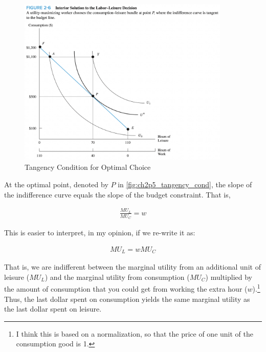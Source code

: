 \FloatBarrier

\begin{figure}[!htb]
    \centering
        \includegraphics[width=0.9\textwidth]{../input/ch_2p5_tangency_cond.png}
    \caption{Tangency Condition for Optimal Choice}
    \label{fig:ch2p5_tangency_cond}
\end{figure}

\FloatBarrier

At the optimal point, denoted by $P$ 
in \autoref{fig:ch2p5_tangency_cond},
the slope of the indifference curve equals
the slope of the budget constraint.
That is,

\begin{align}
    \frac{MU_L}{MU_C} = w
\end{align}

This is easier to interpret, in my opinion, if 
we re-write it as:

\begin{align}
    MU_L = w MU_C
\end{align}

That is, we are indifferent between 
the marginal utility from an additional unit of 
leisure ($MU_L$) and the marginal 
utility from consumption ($MU_C$) multiplied by 
the amount of consumption that you could get
from working the extra hour ($w$).\footnote{I think
this is based on a normalization, so that 
the price of one unit of the consumption good 
is 1.} 
Thus, the last dollar spent on consumption
yields the same marginal utility as the last dollar
spent on leisure.

